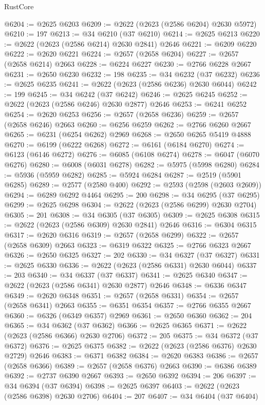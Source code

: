 \begin{lexlean}{RustCore}
\begin{coremodule}
@6204 := @2625 @6203
@6209 := @2622 (@2623 (@2586 @6204) @2630 @5972)
@6210 := 197
@6213 := @34 @6210 (@37 @6210)
@6214 := @2625 @6213
@6220 := @2622 (@2623 (@2586 @6214) @2630 @2841) @2646
@6221 := @6209 @6220
@6222 := @2620 @6221
@6224 := @2657 (@2658 @6204)
@6227 := @2657 (@2658 @6214) @2663
@6228 := @6224 @6227
@6230 := @2766 @6228 @2667
@6231 := @2650 @6230
@6232 := 198
@6235 := @34 @6232 (@37 @6232)
@6236 := @2625 @6235
@6241 := @2622 (@2623 (@2586 @6236) @2630 @6044)
@6242 := 199
@6245 := @34 @6242 (@37 @6242)
@6246 := @2625 @6245
@6252 := @2622 (@2623 (@2586 @6246) @2630 @2877) @2646
@6253 := @6241 @6252
@6254 := @2620 @6253
@6256 := @2657 (@2658 @6236)
@6259 := @2657 (@2658 @6246) @2663
@6260 := @6256 @6259
@6262 := @2766 @6260 @2667
@6265 := @6231 (@6254 @6262) @2969
@6268 := @2650 @6265 @5419 @4888
@6270 := @6199 (@6222 @6268)
@6272 := @6161 (@6184 @6270)
@6274 := @6123 (@6146 @6272)
@6276 := @6085 (@6108 @6274)
@6278 := @6047 (@6070 @6276)
@6280 := @6008 (@6031 @6278)
@6282 := @5975 (@5998 @6280)
@6284 := @5936 (@5959 @6282)
@6285 := @5924 @6284
@6287 := @2519 (@5901 @6285)
@6289 := @2577 (@2580 @400)
@6292 := @2593 (@2598 (@2603 @2609))
@6294 := @6289 @6292 @4464
@6295 := 200
@6298 := @34 @6295 (@37 @6295)
@6299 := @2625 @6298
@6304 := @2622 (@2623 (@2586 @6299) @2630 @2704)
@6305 := 201
@6308 := @34 @6305 (@37 @6305)
@6309 := @2625 @6308
@6315 := @2622 (@2623 (@2586 @6309) @2630 @2841) @2646
@6316 := @6304 @6315
@6317 := @2620 @6316
@6319 := @2657 (@2658 @6299)
@6322 := @2657 (@2658 @6309) @2663
@6323 := @6319 @6322
@6325 := @2766 @6323 @2667
@6326 := @2650 @6325
@6327 := 202
@6330 := @34 @6327 (@37 @6327)
@6331 := @2625 @6330
@6336 := @2622 (@2623 (@2586 @6331) @2630 @6044)
@6337 := 203
@6340 := @34 @6337 (@37 @6337)
@6341 := @2625 @6340
@6347 := @2622 (@2623 (@2586 @6341) @2630 @2877) @2646
@6348 := @6336 @6347
@6349 := @2620 @6348
@6351 := @2657 (@2658 @6331)
@6354 := @2657 (@2658 @6341) @2663
@6355 := @6351 @6354
@6357 := @2766 @6355 @2667
@6360 := @6326 (@6349 @6357) @2969
@6361 := @2650 @6360
@6362 := 204
@6365 := @34 @6362 (@37 @6362)
@6366 := @2625 @6365
@6371 := @2622 (@2623 (@2586 @6366) @2630 @2706)
@6372 := 205
@6375 := @34 @6372 (@37 @6372)
@6376 := @2625 @6375
@6382 := @2622 (@2623 (@2586 @6376) @2630 @2729) @2646
@6383 := @6371 @6382
@6384 := @2620 @6383
@6386 := @2657 (@2658 @6366)
@6389 := @2657 (@2658 @6376) @2663
@6390 := @6386 @6389
@6392 := @2737 @6390 @2667
@6393 := @2650 @6392
@6394 := 206
@6397 := @34 @6394 (@37 @6394)
@6398 := @2625 @6397
@6403 := @2622 (@2623 (@2586 @6398) @2630 @2706)
@6404 := 207
@6407 := @34 @6404 (@37 @6404)

\end{coremodule}
\end{lexlean}
